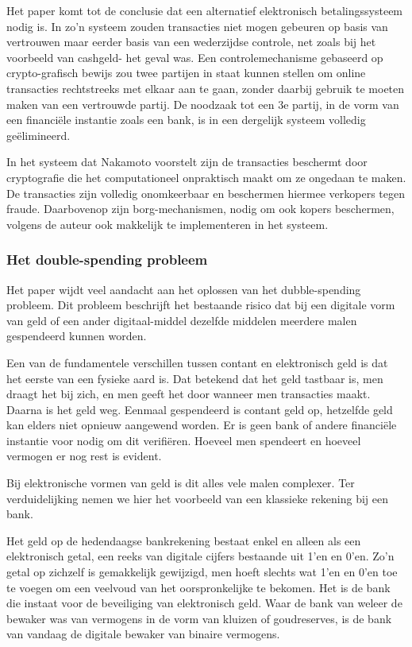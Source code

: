 			Het paper komt tot de conclusie dat een alternatief elektronisch betalingssysteem nodig is. In zo’n systeem zouden transacties niet mogen gebeuren op basis van vertrouwen maar eerder basis van een wederzijdse controle, net zoals bij het voorbeeld van cashgeld- het geval was. Een controlemechanisme gebaseerd op crypto-grafisch bewijs zou twee partijen in staat kunnen stellen om online transacties rechtstreeks met elkaar aan te gaan, zonder daarbij gebruik te moeten maken van een vertrouwde partij. De noodzaak tot een 3e partij, in de vorm van een financiële instantie zoals een bank, is in een dergelijk systeem volledig geëlimineerd.
		
			In het systeem dat Nakamoto voorstelt zijn de transacties beschermt door cryptografie die het computationeel onpraktisch maakt om ze ongedaan te maken. De transacties zijn volledig onomkeerbaar en beschermen hiermee verkopers tegen fraude. Daarbovenop zijn borg-mechanismen, nodig om ook kopers beschermen, volgens de auteur ook makkelijk te implementeren in het systeem.
			
			\subsubsection{Het double-spending probleem}
			Het paper wijdt veel aandacht aan het oplossen van het dubble-spending probleem. Dit probleem beschrijft het bestaande risico dat bij een digitale vorm van geld of een ander digitaal-middel dezelfde middelen meerdere malen gespendeerd kunnen worden.
			
			Een van de fundamentele verschillen tussen contant en elektronisch geld is dat het eerste van een fysieke aard is. Dat betekend dat het geld tastbaar is, men draagt het bij zich, en men geeft het door wanneer men transacties maakt. Daarna is het geld weg. Eenmaal gespendeerd is contant geld op, hetzelfde geld kan elders niet opnieuw aangewend worden. Er is geen bank of andere financiële instantie voor nodig om dit verifiëren. Hoeveel men spendeert en hoeveel vermogen er nog rest is evident. 
			
			Bij elektronische vormen van geld is dit alles vele malen complexer. Ter verduidelijking nemen we hier het voorbeeld van een klassieke rekening bij een bank.
			
			Het geld op de hedendaagse bankrekening bestaat enkel en alleen als een elektronisch getal, een reeks van digitale cijfers bestaande uit 1’en en 0’en. Zo’n getal op zichzelf is gemakkelijk gewijzigd, men hoeft slechts wat 1’en en 0’en toe te voegen om een veelvoud van het oorspronkelijke te bekomen. Het is de bank die instaat voor de beveiliging van elektronisch geld. Waar de bank van weleer de bewaker was van vermogens in de vorm van kluizen of goudreserves, is de bank van vandaag de digitale bewaker van binaire vermogens.
			
